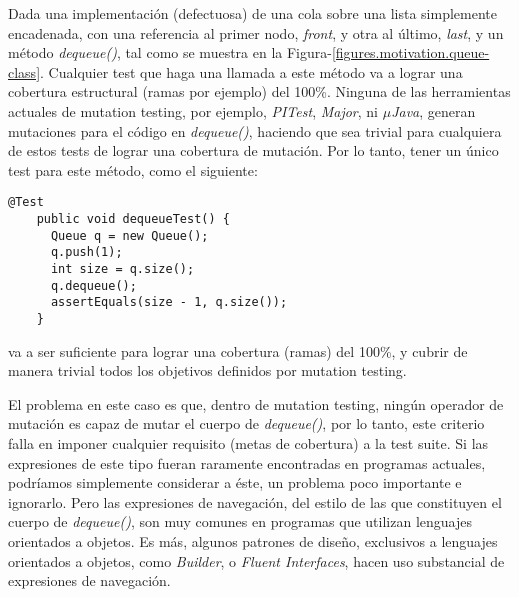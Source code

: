 Dada una implementaci\'on (defectuosa) de una cola sobre una lista simplemente encadenada, con una referencia al primer nodo, \emph{front}, y otra al \'ultimo, \emph{last}, y un m\'etodo \emph{dequeue()}, tal como se muestra en la Figura-\ref{figures.motivation.queue-class}. Cualquier test que haga una llamada a este m\'etodo va a lograr una cobertura estructural (ramas por ejemplo) del 100\%.
Ninguna de las herramientas actuales de mutation testing, por ejemplo, \emph{PITest}, \emph{Major}, ni \emph{$\mu$Java}, generan mutaciones para el c\'odigo en \emph{dequeue()}, haciendo que sea trivial para cualquiera de estos tests de lograr una cobertura de mutaci\'on. Por lo tanto, tener un \'unico test para este m\'etodo, como el siguiente:
\begin{center}
	\begin{lstlisting}[frame=tlrb, mathescape=true]
    @Test
    public void dequeueTest() {
      Queue q = new Queue();
      q.push(1);
      int size = q.size();
      q.dequeue();
      assertEquals(size - 1, q.size());
    }
	\end{lstlisting}
\end{center}
va a ser suficiente para lograr una cobertura (ramas) del 100\%, y cubrir de manera trivial todos los objetivos definidos por mutation testing.

El problema en este caso es que, dentro de mutation testing, ning\'un operador de mutaci\'on es capaz de mutar el cuerpo de \emph{dequeue()}, por lo tanto, este criterio falla en imponer cualquier requisito (metas de cobertura) a la test suite. Si las expresiones de este tipo fueran raramente encontradas en programas actuales, podr\'iamos simplemente considerar a \'este, un problema poco importante e ignorarlo. Pero las expresiones de navegaci\'on, del estilo de las que constituyen el cuerpo de \emph{dequeue()}, son muy comunes en programas que utilizan lenguajes orientados a objetos. Es m\'as, algunos patrones de dise\~no, exclusivos a lenguajes orientados a objetos, como \emph{Builder}, o \emph{Fluent Interfaces}, hacen uso substancial de expresiones de navegaci\'on.


